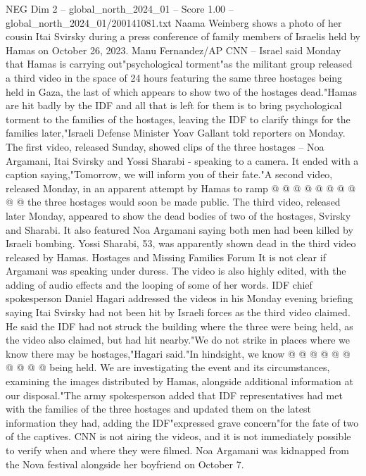 \begin{textsample}{NEG Dim 2 – global\_north\_2024\_01 – Score 1.00 – global\_north\_2024\_01/200141081.txt}  \label{ex:f2_neg_241}
Naama Weinberg shows a photo of her cousin Itai Svirsky during a press conference of family members of Israelis held by Hamas on October 26, 2023.
Manu Fernandez/AP CNN -- Israel said Monday that Hamas is carrying out"psychological torment"as the militant group released a third video in the space of 24 hours featuring the same three hostages being held in Gaza, the last of which appears to show two of the hostages dead."Hamas are hit badly by the IDF and all that is left for them is to bring psychological torment to the families of the hostages, leaving the IDF to clarify things for the families later,"Israeli Defense Minister Yoav Gallant told reporters on Monday.
The first video, released Sunday, showed clips of the three hostages -- Noa Argamani, Itai Svirsky and Yossi Sharabi - speaking to a camera.
It ended with a caption saying,"Tomorrow, we will inform you of their fate."A second video, released Monday, in an apparent attempt by Hamas to ramp @ @ @ @ @ @ @ @ @ @ the three hostages would soon be made public.
The third video, released later Monday, appeared to show the dead bodies of two of the hostages, Svirsky and Sharabi.
It also featured Noa Argamani saying both men had been killed by Israeli bombing.
Yossi Sharabi, 53, was apparently shown dead in the third video released by Hamas.
Hostages and Missing Families Forum It is not clear if Argamani was speaking under duress.
The video is also highly edited, with the adding of audio effects and the looping of some of her words.
IDF chief spokesperson Daniel Hagari addressed the videos in his Monday evening briefing saying Itai Svirsky had not been hit by Israeli forces as the third video claimed.
He said the IDF had not struck the building where the three were being held, as the video also claimed, but had hit nearby."We do not strike in places where we know there may be hostages,"Hagari said."In hindsight, we know @ @ @ @ @ @ @ @ @ @ being held.
We are investigating the event and its circumstances, examining the images distributed by Hamas, alongside additional information at our disposal."The army spokesperson added that IDF representatives had met with the families of the three hostages and updated them on the latest information they had, adding the IDF"expressed grave concern"for the fate of two of the captives.
CNN is not airing the videos, and it is not immediately possible to verify when and where they were filmed.
Noa Argamani was kidnapped from the Nova festival alongside her boyfriend on October 7.

\end{textsample}
